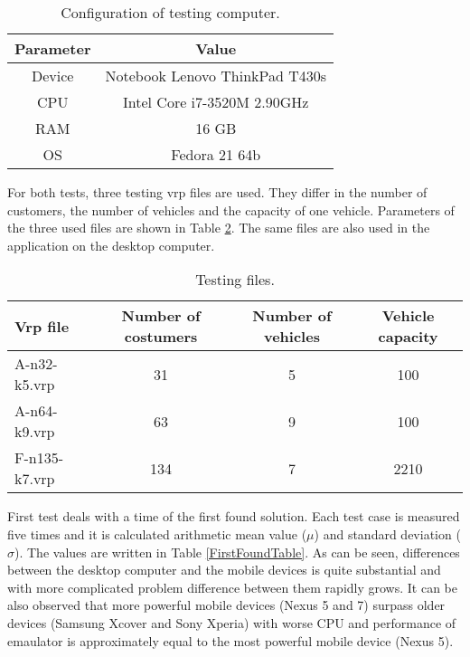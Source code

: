 \begin{table}[h!]
    \begin{tabular}{|c|c|}
        \hline
        \textbf{Parameter} &
        \textbf{Value} \\ \hline \hline
        Device    & Notebook Lenovo ThinkPad T430s \\ \hline
        CPU       & Intel Core i7-3520M 2.90GHz    \\ \hline
        RAM       & 16 GB                          \\ \hline
        OS        & Fedora 21 64b                  \\ \hline
    \end{tabular}
    \centering
    \caption{Configuration of testing computer.}
    \label{TestingComputerTable}
\end{table}

For both tests, three testing vrp files are used. They differ in the number of customers, the number of vehicles and
the capacity of one vehicle. Parameters of the three used files are shown in Table \ref{TestingFilesTable}. The same
files are also used in the application on the desktop computer.

\begin{table}[h!]
    \begin{tabular}{|l|c|c|c|}
        \hline
        \textbf{Vrp file} &
        \textbf{Number of costumers} &
        \textbf{Number of vehicles} &
        \textbf{Vehicle capacity} \\ \hline \hline
        A-n32-k5.vrp   & 31   & 5 & 100  \\ \hline
        A-n64-k9.vrp   & 63   & 9 & 100  \\ \hline
        F-n135-k7.vrp  & 134  & 7 & 2210 \\ \hline
    \end{tabular}
    \centering
    \caption{Testing files.}
    \label{TestingFilesTable}
\end{table}

First test deals with a time of the first found solution. Each test case is measured five times and it is calculated
arithmetic mean value ($\mu$) and standard deviation ($\sigma$). The values are written in Table \ref{FirstFoundTable}.
As can be seen, differences between the desktop computer and the mobile devices is quite substantial and with more
complicated problem difference between them rapidly grows. It can be also observed that more powerful mobile devices
(Nexus 5 and 7) surpass older devices (Samsung Xcover and Sony Xperia) with worse CPU and performance of emaulator is
approximately equal to the most powerful mobile device (Nexus 5).

